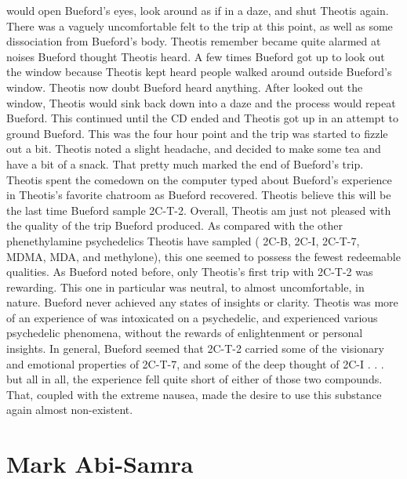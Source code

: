 \documentclass[12pt]{book}
\begin{document}
would open Bueford's eyes, look around as if in a daze, and shut Theotis again. There was a vaguely uncomfortable felt to the trip at this point, as well as some dissociation from Bueford's body. Theotis remember became quite alarmed at noises Bueford thought Theotis heard. A few times Bueford got up to look out the window because Theotis kept heard people walked around outside Bueford's window. Theotis now doubt Bueford heard anything. After looked out the window, Theotis would sink back down into a daze and the process would repeat Bueford. This continued until the CD ended and Theotis got up in an attempt to ground Bueford. This was the four hour point and the trip was started to fizzle out a bit. Theotis noted a slight headache, and decided to make some tea and have a bit of a snack. That pretty much marked the end of Bueford's trip. Theotis spent the comedown on the computer typed about Bueford's experience in Theotis's favorite chatroom as Bueford recovered. Theotis believe this will be the last time Bueford sample 2C-T-2. Overall, Theotis am just not pleased with the quality of the trip Bueford produced. As compared with the other phenethylamine psychedelics Theotis have sampled ( 2C-B, 2C-I, 2C-T-7, MDMA, MDA, and methylone), this one seemed to possess the fewest redeemable qualities. As Bueford noted before, only Theotis's first trip with 2C-T-2 was rewarding. This one in particular was neutral, to almost uncomfortable, in nature. Bueford never achieved any states of insights or clarity. Theotis was more of an experience of was intoxicated on a psychedelic, and experienced various psychedelic phenomena, without the rewards of enlightenment or personal insights. In general, Bueford seemed that 2C-T-2 carried some of the visionary and emotional properties of 2C-T-7, and some of the deep thought of 2C-I . . . but all in all, the experience fell quite short of either of those two compounds. That, coupled with the extreme nausea, made the desire to use this substance again almost non-existent.



\chapter{Mark Abi-Samra}
\end{document}
